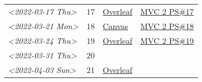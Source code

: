 \documentclass[letterpaper]{article}
\begin{document}
\begin{center}
\begin{tabular}{lrll}
\textit{<2022-03-17 Thu>} & 17 & \href{https://www.overleaf.com/project/6231772f4c6371c98cbaabd1}{Overleaf} & \href{../../../src/mathematics/multi_variable_calculus/KBhmvc_2_ps_17.org}{MVC 2 PS\#17}\\
\textit{<2022-03-21 Mon>} & 18 & \href{https://nuevaschool.instructure.com/courses/4135/assignments/68844}{Canvas} & \href{../../../src/mathematics/multi_variable_calculus/KBhmvc_2_ps_18.org}{MVC 2 PS\#18}\\
\textit{<2022-03-24 Thu>} & 19 & \href{https://www.overleaf.com/project/623890fa572c20eb441fee68}{Overleaf} & \href{../../../src/mathematics/multi_variable_calculus/KBh2_ps_19.org}{MVC 2 PS\#19}\\
\textit{<2022-03-31 Thu>} & 20 &  & \\
\textit{<2022-04-03 Sun>} & 21 & \href{https://www.overleaf.com/project/6249e9f782a57a451c5682c5}{Overleaf} & \\
\end{tabular}
\end{center}
\end{document}

